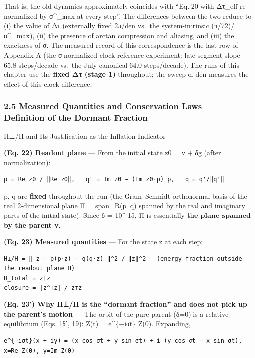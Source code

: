 \documentclass[
  a4paper,
]{ltjsarticle}
\begin{document}
That is, the old dynamics approximately coincides with ``Eq. 20 with
Δτ\_eff re-normalized by σ\^{}\_max at every step''. The differences
between the two reduce to (i) the value of Δτ (externally fixed 2π/den
vs.~the system-intrinsic (π/72)/σ\^{}\_max), (ii) the presence of arctan
compression and aliasing, and (iii) the exactness of σ. The measured
record of this correspondence is the last row of Appendix A (the
σ-normalized-clock reference experiment: late-segment slope 65.8
steps/decade vs.~the July canonical 64.0 steps/decade). The runs of this
chapter use the \textbf{fixed Δτ (stage 1)} throughout; the sweep of den
measures the effect of this clock difference.

\subsubsection{2.5 Measured Quantities and Conservation Laws ---
Definition of the Dormant
Fraction}\label{measured-quantities-and-conservation-laws-definition-of-the-dormant-fraction}

H⊥/H and Its Justification as the Inflation Indicator

\textbf{(Eq. 22) Readout plane} --- From the initial state z0 = v + δg
(after normalization):

\begin{verbatim}
p = Re z0 / ‖Re z0‖,   q' = Im z0 − (Im z0·p) p,   q = q'/‖q'‖
\end{verbatim}

p, q are \textbf{fixed} throughout the run (the Gram--Schmidt
orthonormal basis of the real 2-dimensional plane Π = span\_R(p, q)
spanned by the real and imaginary parts of the initial state). Since δ =
10\^{}-15, Π is essentially \textbf{the plane spanned by the parent v}.

\textbf{(Eq. 23) Measured quantities} --- For the state z at each step:

\begin{verbatim}
H⊥/H = ‖ z − p(p·z) − q(q·z) ‖^2 / ‖z‖^2   (energy fraction outside the readout plane Π)
H_total = z†z
closure = |z^Tz| / z†z
\end{verbatim}

\textbf{(Eq. 23') Why H⊥/H is the ``dormant fraction'' and does not pick
up the parent's motion} --- The orbit of the pure parent (δ=0) is a
relative equilibrium (Eqs. 15', 19): Z(t) = e\^{}\{−iσt\} Z(0).
Expanding,

\begin{verbatim}
e^{−iσt}(x + iy) = (x cos σt + y sin σt) + i (y cos σt − x sin σt),   x=Re Z(0), y=Im Z(0)
\end{verbatim}
\end{document}
